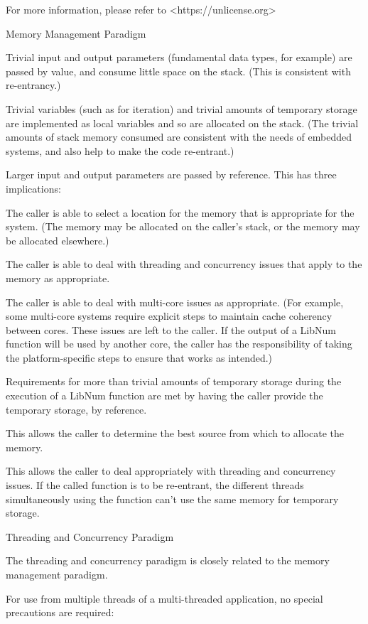 For more information, please refer to <https://unlicense.org>

Memory Management Paradigm

Trivial input and output parameters (fundamental data types, for example)
are passed by value, and consume little space on the stack. (This is
consistent with re-entrancy.)

Trivial variables (such as for iteration) and trivial amounts of
temporary storage are implemented as local variables and so are allocated
on the stack. (The trivial amounts of stack memory consumed are consistent
with the needs of embedded systems, and also help to make the code re-entrant.)

Larger input and output parameters are passed by reference. This has three
implications:

The caller is able to select a location for the memory that is appropriate
for the system. (The memory may be allocated on the caller's stack, or the
memory may be allocated elsewhere.)

The caller is able to deal with threading and concurrency issues that
apply to the memory as appropriate.

The caller is able to deal with multi-core issues as appropriate.
(For example, some multi-core systems require explicit steps to maintain
cache coherency between cores. These issues are left to the caller.
If the output of a LibNum function will be used by another core, the
caller has the responsibility of taking the platform-specific steps to
ensure that works as intended.)

Requirements for more than trivial amounts of temporary storage during
the execution of a LibNum function are met by having the caller provide
the temporary storage, by reference.

This allows the caller to determine the best source from which to allocate
the memory.

This allows the caller to deal appropriately with threading and
concurrency issues. If the called function is to be re-entrant, the
different threads simultaneously using the function can't use the same
memory for temporary storage.

Threading and Concurrency Paradigm

The threading and concurrency paradigm is closely related to the memory
management paradigm.

For use from multiple threads of a multi-threaded application, no
special precautions are required:

